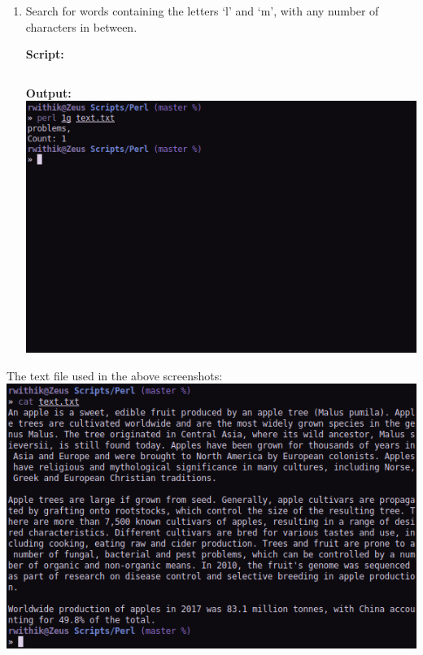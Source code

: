 \documentclass[10pt,a4paper,titlepage]{report}
\begin{document}
\begin{enumerate}
	\item Search for words containing the letters `l’ and `m’, with any number of characters in between.\newline
	\par
	\textbf{Script: }\newline
	\inputminted[tabsize=4]{perl}{../Scripts/Perl/1g}
	\pagebreak
	\textbf{Output: }\newline\newline
	\includegraphics[width=\linewidth]{../Images/Perl/1g.png}
\end{enumerate}
\pagebreak
\par The text file used in the above screenshots:\newline\newline
\includegraphics[width=\linewidth]{../Images/Perl/perl_text.png}
\end{document}
